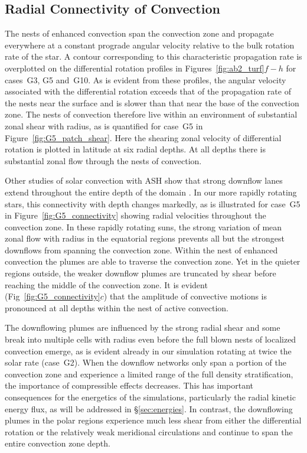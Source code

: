 \subsection{Radial Connectivity of Convection}
The nests of enhanced convection span the
convection zone and propagate everywhere at a constant prograde angular velocity
relative to the bulk rotation rate of the star.  A contour
corresponding to this characteristic propagation rate is overplotted
on the differential rotation profiles in Figures~\ref{fig:ab2_turf}$f-h$
for cases~G3, G5 and~G10.  As is
evident from these profiles, the angular velocity associated with the differential rotation
exceeds that of the propagation rate of the nests near the surface and
is slower than that near the base of the convection zone.  The nests of convection
therefore live within an environment of substantial zonal shear with radius, as is
quantified for case~G5 in Figure~\ref{fig:G5_patch_shear}.  Here the
shearing zonal velocity of differential rotation is plotted in latitude at six radial
depths.  At all depths there is substantial zonal flow through the nests of
convection.  

Other studies of solar convection with ASH show that strong
downflow lanes extend throughout the entire depth of the domain
\citep{Miesch_et_al_2000,Brun&Toomre_2002,Miesch_et_al_2008}.  In our
more rapidly rotating stars, this connectivity with depth changes
markedly, as is illustrated for case~G5 in
Figure~\ref{fig:G5_connectivity} showing radial velocities throughout
the convection zone.  In these rapidly rotating suns, the strong
variation of mean zonal flow with radius in the equatorial regions
prevents all but the strongest downflows from spanning the convection
zone.  Within the nest of enhanced convection the plumes are able to
traverse the convection zone.  Yet in the quieter regions outside, the
weaker downflow plumes are truncated by shear before reaching the
middle of the convection zone.  It is evident
(Fig~\ref{fig:G5_connectivity}$c$) that the amplitude of
convective motions is pronounced at all depths within the nest of active
convection.



The downflowing plumes are influenced by the strong radial shear and
some break into multiple cells with radius even before the full blown
nests of localized convection emerge, as is evident already in our
simulation rotating at twice the solar rate (case~G2).
%
When the downflow networks only span a portion of the convection zone
and experience a limited range of the full density stratification, the
importance of compressible effects decreases.  This has important
consequences for the energetics of the simulations, particularly the
radial kinetic energy flux, as will be addressed in
\S\ref{sec:energies}. In contrast, the downflowing plumes in the polar
regions experience much less shear from either the differential
rotation or the relatively weak meridional circulations and continue
to span the entire convection zone depth.


